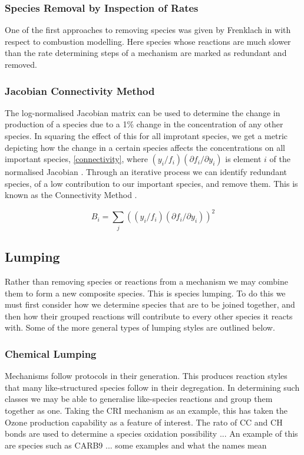 \subsubsection{Species Removal by Inspection of Rates}
One of the first approaches to removing species was given by Frenklach in \cite{frenk} with respect to combustion modelling. Here species whose reactions are much slower than the rate determining steps of a mechanism are marked as redundant and removed. 

\subsubsection{Jacobian Connectivity Method}

The log-normalised Jacobian matrix can be used to determine the change in production of a species due to a 1\% change in the concentration of any other species. In squaring the effect of this for all improtant species, we get a metric depicting how the change in a certain species affects the concentrations on all important species, \autoref{connectivity}, where $({y_i}/{f_i})({\partial f_i}/{\partial y_i})$ is element $i$ of the normalised Jacobian . Through an iterative process we can identify redundant species, of a low contribution to our important species, and remove them. This is known as the Connectivity Method \cite{cm}.


\begin{equation}
B_i  = \sum_j(({y_i}/{f_i})({\partial f_i}/{\partial y_i}))^2 \label{connectivity}
\end{equation}

\subsection{Lumping}
Rather than removing species or reactions from a mechanism we may combine them to form a new composite species. This is species lumping. To do this we must first consider how we determine species that are to be joined together, and then how their grouped reactions will contribute to every other species it reacts with. Some of the more general types of lumping styles are outlined below. 


\subsubsection{Chemical Lumping}
Mechanisms follow protocols in their generation. This produces reaction styles that many like-structured species follow in their degregation. In determining such classes we may be able to generalise like-species reactions and group them together as one. Taking the CRI mechanism as an example, this has taken the Ozone production capability as a feature of interest. The rato of CC and CH bonds are used to determine a species oxidation possibility ... An example of this are species such as CARB9  ... some examples and what the names mean \\

